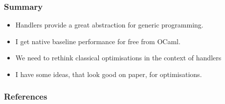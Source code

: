 \documentclass[10pt,compress]{beamer}
\begin{document}
\begin{frame}
  \frametitle{Summary}
  \begin{itemize}
    \item Handlers provide a great abstraction for generic programming.
    \item I get native baseline performance for free from OCaml.
    \item We need to rethink classical optimisations in the context of handlers
    \item I have some ideas, that look good on paper, for optimisations.
  \end{itemize}
\end{frame}

\begin{frame}
  \frametitle{References}
  \nocite{*}
  
  
\end{frame}
\end{document}
